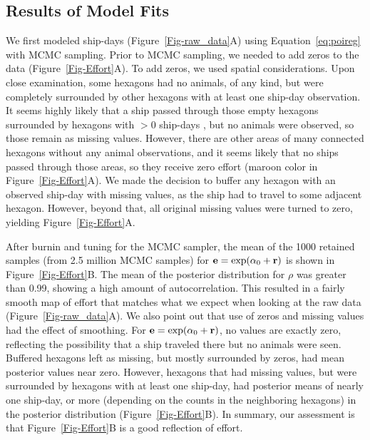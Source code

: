 \documentclass[11pt, titlepage]{article}
\begin{document}
\begin{spacing}{1.9}
\begin{flushleft}
\subsection{Results of Model Fits}

We first modeled ship-days (Figure~\ref{Fig-raw_data}A) using Equation~\eqref{eq:poireg} with MCMC sampling.  Prior to MCMC sampling, we needed to add zeros to the data (Figure~\ref{Fig-Effort}A).  To add zeros, we used spatial considerations.  Upon close examination, some hexagons had no animals, of any kind, but were completely surrounded by other hexagons with at least one ship-day observation.  It seems highly likely that a ship passed through those empty hexagons surrounded by hexagons with $>0$ ship-days , but no animals were observed, so those remain as missing values.  However, there are other areas of many connected hexagons without any animal observations, and it seems likely that no ships passed through those areas, so they receive zero effort (maroon color in Figure~\ref{Fig-Effort}A). We made the decision to buffer any hexagon with an observed ship-day with missing values, as the ship had to travel to some adjacent hexagon.  However, beyond that, all original missing values were turned to zero, yielding Figure~\ref{Fig-Effort}A.

After burnin and tuning for the MCMC sampler, the mean of the 1000 retained samples (from 2.5 million MCMC samples) for $\mathbf{e} = \exp(\alpha_{0} + \mathbf{r})$ is shown in Figure~\ref{Fig-Effort}B.  The mean of the posterior distribution for $\rho$ was greater than 0.99, showing a high amount of autocorrelation.  This resulted in a fairly smooth map of effort that matches what we expect when looking at the raw data (Figure~\ref{Fig-raw_data}A).  We also point out that use of zeros and missing values had the effect of smoothing. For $\mathbf{e} = \exp(\alpha_{0} + \mathbf{r})$, no values are exactly zero, reflecting the possibility that a ship traveled there but no animals were seen.  Buffered hexagons left as missing, but mostly surrounded by zeros, had mean posterior values near zero. However, hexagons that had missing values, but were surrounded by hexagons with at least one ship-day, had posterior means of nearly one ship-day, or more (depending on the counts in the neighboring hexagons) in the posterior distribution (Figure~\ref{Fig-Effort}B).  In summary, our assessment is that Figure~\ref{Fig-Effort}B is a good reflection of effort.


\end{flushleft}
\end{spacing}
\end{document}
